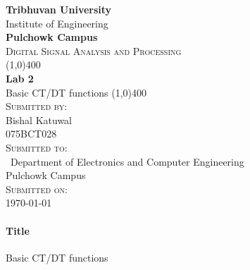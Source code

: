 \documentclass[12pt]{article}
\begin{document}
\begin{titlepage}
    \begin{center}
        \huge{\bfseries  Tribhuvan University}\\
        \Large{Institute of Engineering}\\
        \huge{ \bfseries  Pulchowk Campus}\\[3.2cm]


        \textsc{\Large Digital Signal Analysis and Processing}\\[-0.5cm]
        \line(1,0){400}\\
        \huge{\bfseries Lab 2}\\
        \huge{Basic CT/DT functions}
        \line(1,0){400}\\


        \textsc{\Large Submitted by:}\\
        \Large Bishal Katuwal\\ \large 075BCT028\\    [0.85cm]

        \textsc{\Large Submitted to:}\\\
        \large Department of Electronics and Computer Engineering\\Pulchowk Campus\\    [0.85cm]
        
        \textsc{\Large Submitted on:}\\
        \today
        
    \end{center}
\end{titlepage}
\pagebreak
\paragraph{Title\\}
Basic CT/DT functions
\end{document}
